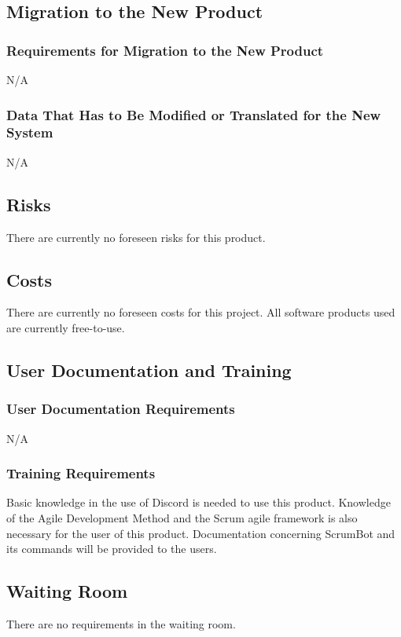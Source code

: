 \documentclass[12pt, titlepage]{article}
\begin{document}
\subsection{Migration to the New Product}
\subsubsection{Requirements for Migration to the New Product}
N/A

\subsubsection{Data That Has to Be Modified or Translated for the New System}
N/A

\subsection{Risks}
There are currently no foreseen risks for this product.

\subsection{Costs}
There are currently no foreseen costs for this project. All software products used are currently free-to-use.

\subsection{User Documentation and Training}
\subsubsection{User Documentation Requirements}
N/A

\subsubsection{Training Requirements}
Basic knowledge in the use of Discord is needed to use this product. Knowledge of the Agile Development Method and the Scrum agile framework is also necessary for the user of this product. Documentation concerning ScrumBot and its commands will be provided to the users.

\subsection{Waiting Room}
There are no requirements in the waiting room.
\end{document}
